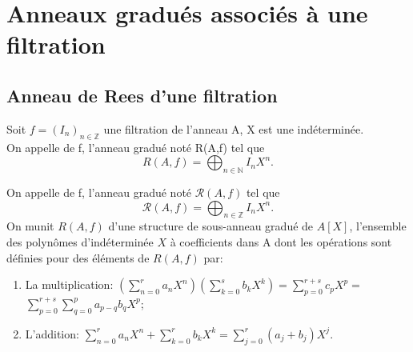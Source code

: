 \section{Anneaux gradués associés à une filtration}
\subsection{Anneau de Rees d'une filtration}
\begin{madefinition}
	Soit $f=(I_n)_{n \in \mathbb{Z}}$ une filtration de l'anneau A, X est une indéterminée.\\
	On appelle  de f, l'anneau gradué noté R(A,f) tel que 
	\[ R(A,f)  =\displaystyle \bigoplus_{n \in \mathbb{N}}{I_n X^n}.  \]
	
	On appelle  de f, l'anneau gradué noté $\mathcal{R}(A,f)$ tel que 
	\[ \mathcal{R}(A,f) = \displaystyle \bigoplus_{n \in \mathbb{Z}}{I_n X^n}.  \]
	On munit $R(A,f)$ d'une structure de sous-anneau gradué de $A[X]$, l'ensemble des polynômes d'indéterminée $X$ à coefficients dans A dont les opérations sont définies pour des éléments de $R(A,f)$ par:
	
	\begin{enumerate}
		\item La multiplication:	$(\sum\limits_{n=0}^{r}a_{n}X^{n})(\sum\limits_{k=0}^{s}b_{k}X^{k})=\sum\limits_{p=0}^{r+s}c_{p}X^{p}=$ $\sum\limits_{p=0}^{r+s}\sum\limits_{q=0}^{p}a_{p-q}b_{q}X^{p}$;
		\item L'addition:   $\sum\limits_{n=0}^{r}a_{n}X^{n}+\sum\limits_{k=0}^{r}b_{k}X^{k}=\sum\limits_{j=0}^{r}(a_{j}+b_{j})X^{j}$.
	\end{enumerate}
\end{madefinition}
